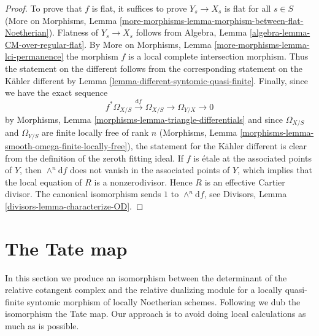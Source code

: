 \begin{proof}
To prove that $f$ is flat, it suffices to prove $Y_s \to X_s$
is flat for all $s \in S$ (More on Morphisms, Lemma
\ref{more-morphisms-lemma-morphism-between-flat-Noetherian}).
Flatness of $Y_s \to X_s$ follows from
Algebra, Lemma \ref{algebra-lemma-CM-over-regular-flat}.
By More on Morphisms, Lemma
\ref{more-morphisms-lemma-lci-permanence}
the morphism $f$ is a local complete intersection morphism.
Thus the statement on the different follows from the
corresponding statement on the K\"ahler different by
Lemma \ref{lemma-different-syntomic-quasi-finite}.
Finally, since we have the exact sequence
$$
f^*\Omega_{X/S} \xrightarrow{\text{d}f} \Omega_{X/S} \to \Omega_{Y/X} \to 0
$$
by Morphisms, Lemma \ref{morphisms-lemma-triangle-differentials}
and since $\Omega_{X/S}$ and $\Omega_{Y/S}$ are finite locally free
of rank $n$ (Morphisms, Lemma
\ref{morphisms-lemma-smooth-omega-finite-locally-free}),
the statement for the K\"ahler different is clear from the definition
of the zeroth fitting ideal. If $f$ is \'etale at the associated
points of $Y$, then $\wedge^n\text{d}f$ does not vanish in
the associated points of $Y$, which implies that the local equation
of $R$ is a nonzerodivisor. Hence $R$ is an effective Cartier divisor.
The canonical isomorphism sends $1$ to $\wedge^n\text{d}f$, see
Divisors, Lemma \ref{divisors-lemma-characterize-OD}.
\end{proof}






\section{The Tate map}
\label{section-tate-map}

\noindent
In this section we produce an isomorphism between
the determinant of the relative cotangent complex and
the relative dualizing module for a locally quasi-finite
syntomic morphism of locally Noetherian schemes. Following
\cite[1.4.4]{Garel} we dub the isomorphism the Tate map.
Our approach is to avoid doing local calculations as
much as is possible.


